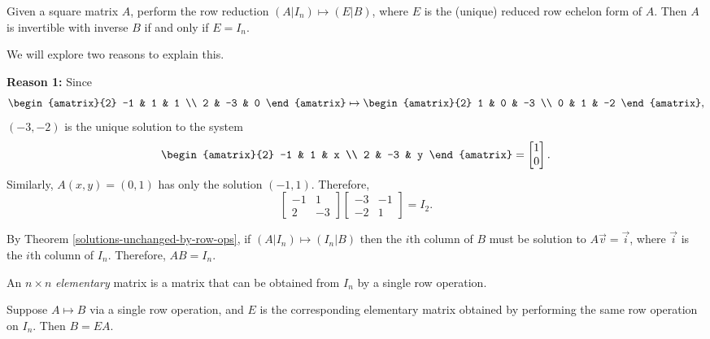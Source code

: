 \begin{prop}\label{matrix-inverse-reduction}
    Given a square matrix $A$, perform the row reduction $(A|I_n) \mapsto (E|B)$, where $E$ is the (unique) reduced row echelon form of $A$. Then $A$ is invertible with inverse $B$ if and only if $E = I_n$.
\end{prop}

We will explore two reasons to explain this.

\textbf{Reason 1:} Since
\[\begin{amatrix}{2}
    -1 & 1 & 1 \\ 2 & -3 & 0
\end{amatrix} \mapsto \begin{amatrix}{2}
    1 & 0 & -3 \\ 0 & 1 & -2
\end{amatrix},\]
$(-3, -2)$ is the unique solution to the system
\[\begin{amatrix}{2}
    -1 & 1 & x \\ 2 & -3 & y
\end{amatrix} = \begin{bmatrix}
    1 \\ 0
\end{bmatrix}.\] Similarly, $A(x, y) = (0, 1)$ has only the solution $(-1, 1)$. Therefore,
\[\begin{bmatrix}
    -1 & 1 \\ 2 & -3
\end{bmatrix}\begin{bmatrix}
    -3 & -1 \\ -2 & 1
\end{bmatrix} = I_2.\]

By Theorem \ref{solutions-unchanged-by-row-ops}, if $(A|I_n) \mapsto (I_n|B)$ then the $i$th column of $B$ must be solution to $A\vec{v} = \vec{i}$, where $\vec{i}$ is the $i$th column of $I_n$. Therefore, $AB = I_n$.

\begin{defn}\label{elementary-matrix-defn}
    An $n \times n$ \emph{elementary} matrix is a matrix that can be obtained from $I_n$ by a single row operation.
\end{defn}

\begin{lemma}
    Suppose $A \mapsto B$ via a single row operation, and $E$ is the corresponding elementary matrix obtained by performing the same row operation on $I_n$. Then $B = EA$.
\end{lemma}


